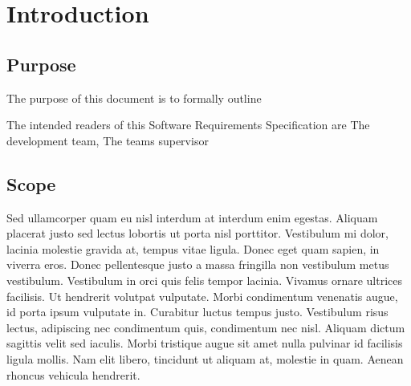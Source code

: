 
\chapter{Introduction} %

\label{Part9Chapter1} %



\section{Purpose}

The purpose of this document is to formally outline 

The intended readers of this Software Requirements Specification are The development team, The teams supervisor 


\section{Scope}

Sed ullamcorper quam eu nisl interdum at interdum enim egestas. Aliquam placerat justo sed lectus lobortis ut porta nisl porttitor. Vestibulum mi dolor, lacinia molestie gravida at, tempus vitae ligula. Donec eget quam sapien, in viverra eros. Donec pellentesque justo a massa fringilla non vestibulum metus vestibulum. Vestibulum in orci quis felis tempor lacinia. Vivamus ornare ultrices facilisis. Ut hendrerit volutpat vulputate. Morbi condimentum venenatis augue, id porta ipsum vulputate in. Curabitur luctus tempus justo. Vestibulum risus lectus, adipiscing nec condimentum quis, condimentum nec nisl. Aliquam dictum sagittis velit sed iaculis. Morbi tristique augue sit amet nulla pulvinar id facilisis ligula mollis. Nam elit libero, tincidunt ut aliquam at, molestie in quam. Aenean rhoncus vehicula hendrerit.

